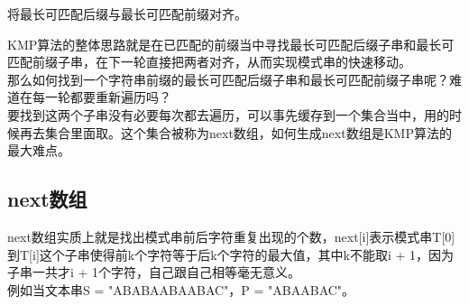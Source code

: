 将最长可匹配后缀与最长可匹配前缀对齐。

\begin{table}[H]
	\centering
\end{table}

KMP算法的整体思路就是在已匹配的前缀当中寻找最长可匹配后缀子串和最长可匹配前缀子串，在下一轮直接把两者对齐，从而实现模式串的快速移动。 \\

那么如何找到一个字符串前缀的最长可匹配后缀子串和最长可匹配前缀子串呢？难道在每一轮都要重新遍历吗？ \\

要找到这两个子串没有必要每次都去遍历，可以事先缓存到一个集合当中，用的时候再去集合里面取。这个集合被称为next数组，如何生成next数组是KMP算法的最大难点。

\subsection{next数组}

next数组实质上就是找出模式串前后字符重复出现的个数，next[i]表示模式串T[0]到T[i]这个子串使得前k个字符等于后k个字符的最大值，其中k不能取i + 1，因为子串一共才i + 1个字符，自己跟自己相等毫无意义。 \\

例如当文本串S = "ABABAABAABAC"，P = "ABAABAC"。

